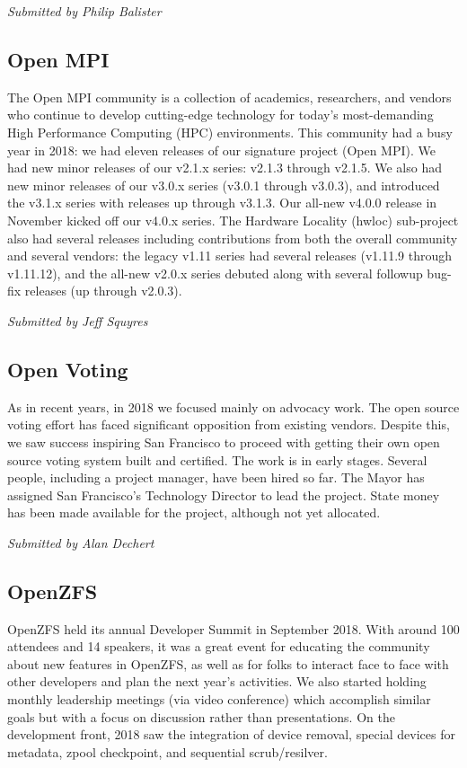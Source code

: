\documentclass[a4paper]{report}
\begin{document}
{\em Submitted by Philip Balister}

\subsection{Open MPI}

The Open MPI community is a collection of academics, researchers, and
vendors who continue to develop cutting-edge technology for today’s
most-demanding High Performance Computing (HPC) environments. This
community had a busy year in 2018: we had eleven releases of our
signature project (Open MPI).  We had new minor releases of our v2.1.x
series: v2.1.3 through v2.1.5.  We also had new minor releases of our
v3.0.x series (v3.0.1 through v3.0.3), and introduced the v3.1.x series
with releases up through v3.1.3.  Our all-new v4.0.0 release in November
kicked off our v4.0.x series.  The Hardware Locality (hwloc) sub-project
also had several releases including contributions from both the overall
community and several vendors: the legacy v1.11 series had several
releases (v1.11.9 through v1.11.12), and the all-new v2.0.x series
debuted along with several followup bug-fix releases (up through
v2.0.3).

{\em Submitted by Jeff Squyres}

\subsection{Open Voting}

As in recent years, in 2018 we focused mainly on advocacy work. The open
source voting effort has faced significant opposition from existing
vendors. Despite this, we saw success inspiring San Francisco to proceed
with getting their own open source voting system built and certified.
The work is in early stages. Several people, including a project
manager, have been hired so far. The Mayor has assigned San Francisco's
Technology Director to lead the project. State money has been made
available for the project, although not yet allocated.

{\em Submitted by Alan Dechert}

\subsection{OpenZFS}

OpenZFS held its annual Developer Summit in September 2018. With around
100 attendees and 14 speakers, it was a great event for educating the
community about new features in OpenZFS, as well as for folks to
interact face to face with other developers and plan the next year’s
activities. We also started holding monthly leadership meetings (via
video conference) which accomplish similar goals but with a focus on
discussion rather than presentations.  On the development front, 2018
saw the integration of device removal, special devices for metadata,
zpool checkpoint, and sequential scrub/resilver.
\end{document}
